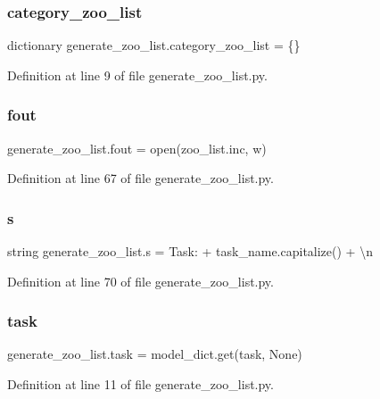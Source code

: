 \subsubsection{\texorpdfstring{category\+\_\+zoo\+\_\+list}{category\_zoo\_list}}
{\footnotesize\ttfamily dictionary generate\+\_\+zoo\+\_\+list.\+category\+\_\+zoo\+\_\+list = \{\}}



Definition at line 9 of file generate\+\_\+zoo\+\_\+list.\+py.

\mbox{\label{namespacegenerate__zoo__list_a856ce3399906c5da79bdf26a784249ae}} 
\subsubsection{\texorpdfstring{fout}{fout}}
{\footnotesize\ttfamily generate\+\_\+zoo\+\_\+list.\+fout = open(\textquotesingle{}zoo\+\_\+list.\+inc\textquotesingle{}, \textquotesingle{}w\textquotesingle{})}



Definition at line 67 of file generate\+\_\+zoo\+\_\+list.\+py.

\mbox{\label{namespacegenerate__zoo__list_ab242661624dc2add618658bc9873f621}} 
\subsubsection{\texorpdfstring{s}{s}}
{\footnotesize\ttfamily string generate\+\_\+zoo\+\_\+list.\+s = \textquotesingle{}Task\+: \textquotesingle{} + task\+\_\+name.\+capitalize() + \textquotesingle{}\textbackslash{}n\textquotesingle{}}



Definition at line 70 of file generate\+\_\+zoo\+\_\+list.\+py.

\mbox{\label{namespacegenerate__zoo__list_ad3dbd35f1d59cff673fdcbc18b300da2}} 
\subsubsection{\texorpdfstring{task}{task}}
{\footnotesize\ttfamily generate\+\_\+zoo\+\_\+list.\+task = model\+\_\+dict.\+get(\textquotesingle{}task\textquotesingle{}, None)}



Definition at line 11 of file generate\+\_\+zoo\+\_\+list.\+py.

